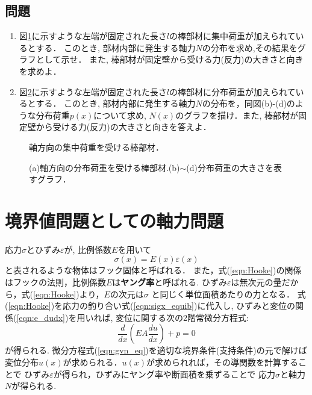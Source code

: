 \documentclass[11pt,a4j]{mybook2}
\begin{document}
\subsection{問題}\label{prb_equiv}
\begin{enumerate}
\item
図\ref{fig:fig3}に示すような左端が固定された長さ$l$の棒部材に集中荷重が加えられているとする．
このとき, 部材内部に発生する軸力$N$の分布を求め,その結果をグラフとして示せ．
また, 棒部材が固定壁から受ける力(反力)の大きさと向きを求めよ．
\item
図\ref{fig:fig3_2}に示すような左端が固定された長さ$l$の棒部材に分布荷重が加えられているとする．
このとき, 部材内部に発生する軸力$N$の分布を，同図(b)-(d)のような分布荷重$p(x)$について求め,
$N(x)$のグラフを描け．また, 棒部材が固定壁から受ける力(反力)の大きさと向きを答えよ．
\end{enumerate}
\begin{figure}[h]
	\begin{center}
	\end{center}
	\caption{軸方向の集中荷重を受ける棒部材．} 
	\label{fig:fig3}
\end{figure}
\begin{figure}[h]
	\begin{center}
	\end{center}
	\caption{(a)軸方向の分布荷重を受ける棒部材.(b)$\sim$(d)分布荷重の大きさを表すグラフ．} 
	\label{fig:fig3_2}
\end{figure}
\section{境界値問題としての軸力問題}\label{BVP}
応力$\sigma$とひずみ$\varepsilon$が, 比例係数$E$を用いて
\begin{equation}
	\sigma(x) =E(x) \varepsilon (x)
	\label{eqn:Hooke}
\end{equation}
と表されるような物体はフック固体と呼ばれる．
また，式(\ref{eqn:Hooke})の関係はフックの法則，比例係数$E$は{\bf ヤング率}と呼ばれる. 
ひずみ$\varepsilon$は無次元の量だから，式(\ref{eqn:Hooke})より，$E$の次元は$\sigma$
と同じく単位面積あたりの力となる．
式(\ref{eqn:Hooke})を応力の釣り合い式(\ref{eqn:sigx_equib})に代入し, 
ひずみと変位の関係(\ref{eqn:e_dudx})を用いれば, 
変位に関する次の2階常微分方程式:
\begin{equation}
	\frac{d}{dx}\left( EA \frac{du}{dx} \right)+p=0
	\label{eqn:gvn_eq}
\end{equation}
が得られる. 微分方程式(\ref{eqn:gvn_eq})を適切な境界条件(支持条件)の元で解けば
変位分布$u(x)$が求められる．$u(x)$が求められれば，その導関数を計算することで
ひずみ$\varepsilon$が得られ，ひずみにヤング率や断面積を乗ずることで
応力$\sigma$と軸力$N$が得られる.
\end{document}
